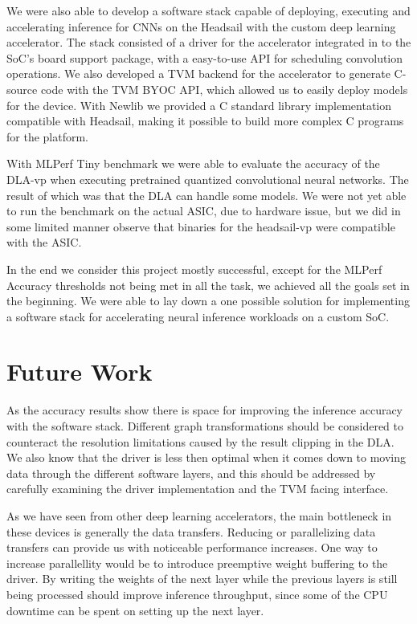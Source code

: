\documentclass[12pt,a4paper,english
]{tunithesis}
\begin{document}
We were also able to develop a software stack capable of deploying, executing and accelerating inference for CNNs on the Headsail with the custom deep learning accelerator.
The stack consisted of a driver for the accelerator integrated in to the SoC's board support package, with a easy-to-use API for scheduling convolution operations.
We also developed a TVM backend for the accelerator to generate C-source code with the TVM BYOC API, which allowed us to easily deploy models for the device.
With Newlib we provided a C standard library implementation compatible with Headsail, making it possible to build more complex C programs for the platform.

With MLPerf Tiny benchmark we were able to evaluate the accuracy of the DLA-vp when executing pretrained quantized convolutional neural networks. The result of which was that the DLA can handle some models. We were not yet able to run the benchmark on the actual ASIC, due to hardware issue, but we did in some limited manner observe that binaries for the headsail-vp were compatible with the ASIC.

In the end we consider this project mostly successful, except for the MLPerf Accuracy thresholds not being met in all the task, we achieved all the goals set in the beginning. We were able to lay down a one possible solution for implementing a software stack for accelerating neural inference workloads on a custom SoC.

\section{Future Work}
As the accuracy results show there is space for improving the inference accuracy with the software stack. Different graph transformations should be considered to counteract the resolution limitations caused by the result clipping in the DLA. We also know that the driver is less then optimal when it comes down to moving data through the different software layers, and this should be addressed by carefully examining the driver implementation and the TVM facing interface.

As we have seen from other deep learning accelerators, the main bottleneck in these devices is generally the data transfers. Reducing or parallelizing data transfers can provide us with noticeable performance increases. One way to increase parallellity would be to introduce preemptive weight buffering to the driver. By writing the weights of the next layer while the previous layers is still being processed should improve inference throughput, since some of the CPU downtime can be spent on setting up the next layer.
\end{document}
